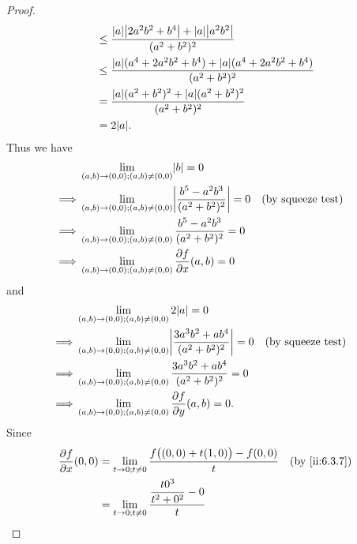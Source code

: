 \begin{proof}
\begin{align*}
                                                   & \leq \dfrac{\abs{a} \abs{2 a^2 b^2 + b^4} + \abs{a} \abs{a^2 b^2}}{(a^2 + b^2)^2}             \\
                                                   & \leq \dfrac{\abs{a} (a^4 + 2 a^2 b^2 + b^4) + \abs{a} (a^4 + 2 a^2 b^2 + b^4)}{(a^2 + b^2)^2} \\
                                                   & = \dfrac{\abs{a} (a^2 + b^2)^2 + \abs{a} (a^2 + b^2)^2}{(a^2 + b^2)^2}                        \\
                                                   & = 2 \abs{a}.
  \end{align*}
  Thus we have
  \begin{align*}
             & \lim_{(a, b) \to (0, 0) ; (a, b) \neq (0, 0)} \abs{b} = 0                                                                  \\
    \implies & \lim_{(a, b) \to (0, 0) ; (a, b) \neq (0, 0)} \abs{\dfrac{b^5 - a^2 b^3}{(a^2 + b^2)^2}} = 0 &  & \text{(by squeeze test)} \\
    \implies & \lim_{(a, b) \to (0, 0) ; (a, b) \neq (0, 0)} \dfrac{b^5 - a^2 b^3}{(a^2 + b^2)^2} = 0                                     \\
    \implies & \lim_{(a, b) \to (0, 0) ; (a, b) \neq (0, 0)} \dfrac{\partial f}{\partial x}(a, b) = 0
  \end{align*}
  and
  \begin{align*}
             & \lim_{(a, b) \to (0, 0) ; (a, b) \neq (0, 0)} 2 \abs{a} = 0                                                                    \\
    \implies & \lim_{(a, b) \to (0, 0) ; (a, b) \neq (0, 0)} \abs{\dfrac{3 a^3 b^2 + a b^4}{(a^2 + b^2)^2}} = 0 &  & \text{(by squeeze test)} \\
    \implies & \lim_{(a, b) \to (0, 0) ; (a, b) \neq (0, 0)} \dfrac{3 a^3 b^2 + a b^4}{(a^2 + b^2)^2} = 0                                     \\
    \implies & \lim_{(a, b) \to (0, 0) ; (a, b) \neq (0, 0)} \dfrac{\partial f}{\partial y}(a, b) = 0.
  \end{align*}
  Since
  \begin{align*}
    \dfrac{\partial f}{\partial x}(0, 0) & = \lim_{t \to 0 ; t \neq 0} \dfrac{f\big((0, 0) + t(1, 0)\big) - f(0, 0)}{t} &  & \by{ii:6.3.7} \\
                                         & = \lim_{t \to 0 ; t \neq 0} \dfrac{\dfrac{t 0^3}{t^2 + 0^2} - 0}{t}                             \\

\end{align*}
\end{proof}
